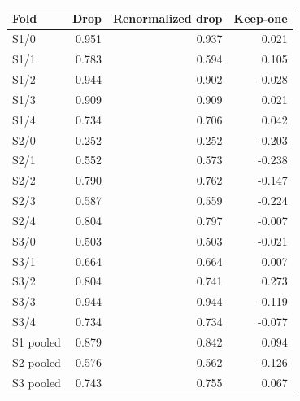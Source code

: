 \begin{tabular}{lrrr}
\toprule
Fold & Drop & Renormalized drop & Keep-one \\
\midrule
S1/0 & 0.951 & 0.937 & 0.021 \\
S1/1 & 0.783 & 0.594 & 0.105 \\
S1/2 & 0.944 & 0.902 & -0.028 \\
S1/3 & 0.909 & 0.909 & 0.021 \\
S1/4 & 0.734 & 0.706 & 0.042 \\
S2/0 & 0.252 & 0.252 & -0.203 \\
S2/1 & 0.552 & 0.573 & -0.238 \\
S2/2 & 0.790 & 0.762 & -0.147 \\
S2/3 & 0.587 & 0.559 & -0.224 \\
S2/4 & 0.804 & 0.797 & -0.007 \\
S3/0 & 0.503 & 0.503 & -0.021 \\
S3/1 & 0.664 & 0.664 & 0.007 \\
S3/2 & 0.804 & 0.741 & 0.273 \\
S3/3 & 0.944 & 0.944 & -0.119 \\
S3/4 & 0.734 & 0.734 & -0.077 \\
\midrule
S1 pooled & 0.879 & 0.842 & 0.094 \\
S2 pooled & 0.576 & 0.562 & -0.126 \\
S3 pooled & 0.743 & 0.755 & 0.067 \\
\bottomrule
\end{tabular}
